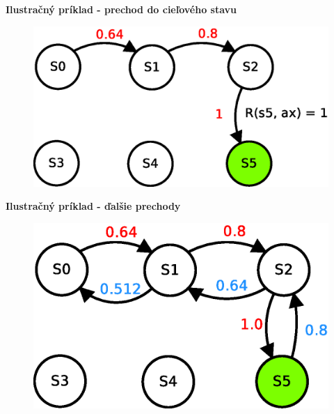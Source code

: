 \documentclass[xcolor=dvipsnames]{beamer}
\begin{document}
\begin{frame}{\bf Ilustračný príklad - prechod do cieľového stavu}

\begin{figure}[!htb]
\includegraphics[scale=.5]{../diagrams/q_learning_table_04.eps}
\end{figure}

\end{frame}

\begin{frame}{\bf Ilustračný príklad - ďalšie prechody}

\begin{figure}[!htb]
\includegraphics[scale=.5]{../diagrams/q_learning_table_05.eps}
\end{figure}

\end{frame}
\end{document}
